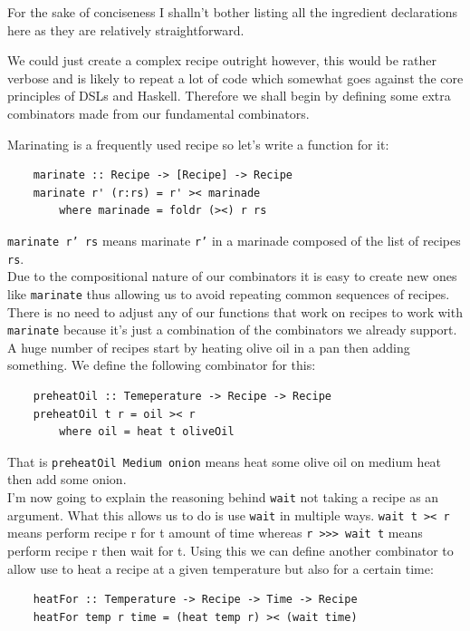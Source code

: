 \documentclass[11pt]{article}
\begin{document}
    For the sake of conciseness I shalln't bother listing all the ingredient
    declarations here as they are relatively straightforward.

    We could just create a complex recipe outright however, this would be rather
    verbose and is likely to repeat a lot of code which somewhat goes against
    the core principles of DSLs and Haskell. Therefore we shall begin by defining
    some extra combinators made from our fundamental combinators.

    Marinating is a frequently used recipe so let's write a function for it:
    \begin{tt}
    \small
    \begin{lstlisting}
    marinate :: Recipe -> [Recipe] -> Recipe
    marinate r' (r:rs) = r' >< marinade
        where marinade = foldr (><) r rs
    \end{lstlisting}
    \end{tt}
    \texttt{marinate r' rs} means marinate \texttt{r'} in a marinade composed
    of the list of recipes \texttt{rs}. \\

    Due to the compositional nature of our combinators it is easy to create new
    ones like \texttt{marinate} thus allowing us to avoid repeating common
    sequences of recipes. There is no need to adjust any of our functions that
    work on recipes to work with \texttt{marinate} because it's just a combination
    of the combinators we already support. \\

    A huge number of recipes start by heating olive oil in a pan then adding something.
    We define the following combinator for this:
    \begin{tt}
    \small
    \begin{lstlisting}
    preheatOil :: Temeperature -> Recipe -> Recipe
    preheatOil t r = oil >< r
        where oil = heat t oliveOil
    \end{lstlisting}
    \end{tt}
    That is \texttt{preheatOil Medium onion} means heat some olive oil on medium heat
    then add some onion. \\

    I'm now going to explain the reasoning behind \texttt{wait} not taking a recipe as
    an argument. What this allows us to do is use \texttt{wait} in multiple ways.
    \texttt{wait t >< r} means perform recipe r for t amount of time whereas
    \texttt{r >>> wait t} means perform recipe r then wait for t. Using this we
    can define another combinator to allow use to heat a recipe at a given temperature
    but also for a certain time:
    \begin{tt}
    \small
    \begin{lstlisting}
    heatFor :: Temperature -> Recipe -> Time -> Recipe
    heatFor temp r time = (heat temp r) >< (wait time)
    \end{lstlisting}
    \end{tt}
\end{document}
